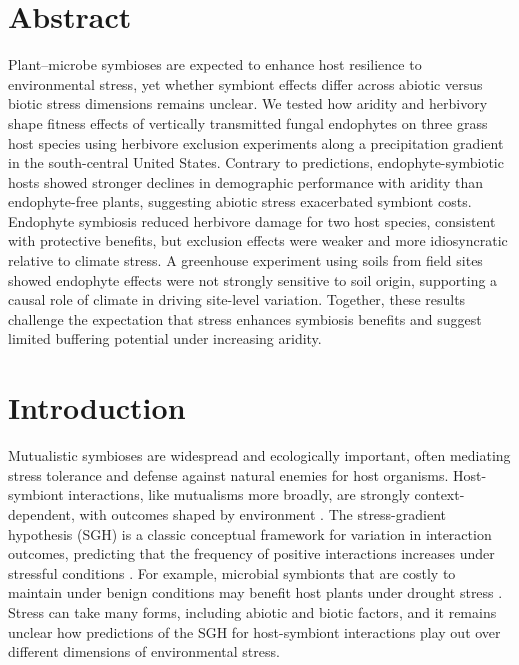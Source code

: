 \documentclass[12pt]{article}\usepackage[]{graphicx}\usepackage[dvipsnames]{xcolor}
\begin{document}
\newpage
\linenumbers
\section*{Abstract}
Plant–microbe symbioses are expected to enhance host resilience to environmental stress, yet whether symbiont effects differ across abiotic versus biotic stress dimensions remains unclear. 
We tested how aridity and herbivory shape fitness effects of vertically transmitted fungal endophytes on three grass host species using herbivore exclusion experiments along a precipitation gradient in the south-central United States. 
Contrary to predictions, endophyte-symbiotic hosts showed stronger declines in demographic performance with aridity than endophyte-free plants, suggesting abiotic stress exacerbated symbiont costs. 
Endophyte symbiosis reduced herbivore damage for two host species, consistent with protective benefits, but exclusion effects were weaker and more idiosyncratic relative to climate stress. 
A greenhouse experiment using soils from field sites showed endophyte effects were not strongly sensitive to soil origin, supporting a causal role of climate in driving site-level variation. 
Together, these results challenge the expectation that stress enhances symbiosis benefits and suggest limited buffering potential under increasing aridity.


\newpage
\section*{Introduction}
Mutualistic symbioses are widespread and ecologically important, often mediating stress tolerance and defense against natural enemies for host organisms. 
Host-symbiont interactions, like mutualisms more broadly, are strongly context-dependent, with outcomes shaped by environment \citep{hoeksema2015context, bronstein1994conditional,hoang2024impacts,rudgers2020climate}. 
The stress-gradient hypothesis (SGH) is a classic conceptual framework for variation in interaction outcomes, predicting that the frequency of positive interactions increases under stressful conditions \citep{louthan2015and,bertness1994positive,holmgren2010strong,maestre2009refining}.
For example, microbial symbionts that are costly to maintain under benign conditions may benefit host plants under drought stress  \citep{giauque2019endophyte}. 
Stress can take many forms, including abiotic and biotic factors, and it remains unclear how predictions of the SGH for host-symbiont interactions play out over different dimensions of environmental stress. 
\end{document}
